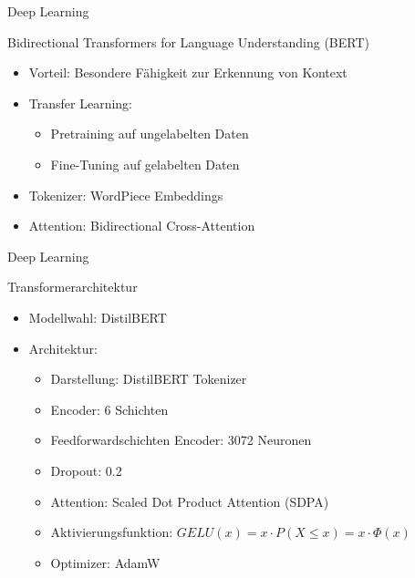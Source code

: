 \documentclass[aspectratio=169]{beamer} %
\begin{document}
\begin{frame}{Deep Learning}
    \begin{block}{Bidirectional Transformers for Language Understanding (BERT)}
        \begin{itemize}
            \item Vorteil: Besondere Fähigkeit zur Erkennung von Kontext
            \item Transfer Learning:
                  \begin{itemize}
                      \item Pretraining auf ungelabelten Daten
                      \item Fine-Tuning auf gelabelten Daten
                  \end{itemize}
            \item Tokenizer: WordPiece Embeddings
            \item Attention: Bidirectional Cross-Attention
        \end{itemize}
    \end{block}
\end{frame}


\begin{frame}{Deep Learning}
    \begin{block}{Transformerarchitektur}
        \begin{itemize}
            \item Modellwahl: DistilBERT \\
            \item  Architektur:
                  \begin{itemize}
                      \item Darstellung: DistilBERT Tokenizer %
                      \item Encoder: 6 Schichten
                      \item Feedforwardschichten Encoder: 3072 Neuronen
                      \item Dropout: 0.2
                      \item Attention: Scaled Dot Product Attention (SDPA)
                      \item Aktivierungsfunktion: $GELU(x) = x \cdot P(X \leq x) = x \cdot \Phi(x) $
                      \item Optimizer: AdamW
                  \end{itemize}
        \end{itemize}
    \end{block}
\end{frame}
\end{document}
